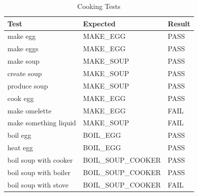 \documentclass[11pt]{article}
\begin{document}
\begin{appendices}
\begin{table}[H]
\scriptsize
\centering
\caption{Cooking Tests}
\label{table:cooking-scores}
\begin{tabular}{lll}
\multicolumn{1}{l|}{Test}                           & \multicolumn{1}{l|}{Expected}           & Result                       \\ \hline
\multicolumn{1}{l|}{make egg}                       & \multicolumn{1}{l|}{MAKE\_EGG}          & \cellcolor[HTML]{67FD9A}PASS \\ \hline
\multicolumn{1}{l|}{make eggs}                      & \multicolumn{1}{l|}{MAKE\_EGG}          & \cellcolor[HTML]{67FD9A}PASS \\ \hline
\multicolumn{1}{l|}{make soup}                      & \multicolumn{1}{l|}{MAKE\_SOUP}         & \cellcolor[HTML]{67FD9A}PASS \\ \hline
\multicolumn{1}{l|}{create soup}                    & \multicolumn{1}{l|}{MAKE\_SOUP}         & \cellcolor[HTML]{67FD9A}PASS \\ \hline
\multicolumn{1}{l|}{produce soup}                   & \multicolumn{1}{l|}{MAKE\_SOUP}         & \cellcolor[HTML]{67FD9A}PASS \\ \hline
\multicolumn{1}{l|}{cook egg}                       & \multicolumn{1}{l|}{MAKE\_EGG}          & \cellcolor[HTML]{67FD9A}PASS \\ \hline
\multicolumn{1}{l|}{make omelette}                  & \multicolumn{1}{l|}{MAKE\_EGG}          & \cellcolor[HTML]{FD6864}FAIL \\ \hline
\multicolumn{1}{l|}{make something liquid}          & \multicolumn{1}{l|}{MAKE\_SOUP}         & \cellcolor[HTML]{FD6864}FAIL \\ \hline
\multicolumn{1}{l|}{boil egg}                       & \multicolumn{1}{l|}{BOIL\_EGG}          & \cellcolor[HTML]{67FD9A}PASS \\ \hline
\multicolumn{1}{l|}{heat egg}                       & \multicolumn{1}{l|}{BOIL\_EGG}          & \cellcolor[HTML]{67FD9A}PASS \\ \hline
\multicolumn{1}{l|}{boil soup with cooker}          & \multicolumn{1}{l|}{BOIL\_SOUP\_COOKER} & \cellcolor[HTML]{67FD9A}PASS \\ \hline
\multicolumn{1}{l|}{boil soup with boiler}          & \multicolumn{1}{l|}{BOIL\_SOUP\_COOKER} & \cellcolor[HTML]{67FD9A}PASS \\ \hline
\multicolumn{1}{l|}{boil soup with stove}           & \multicolumn{1}{l|}{BOIL\_SOUP\_COOKER} & \cellcolor[HTML]{FD6864}FAIL \\ \hline

\end{tabular}
\end{table}
\end{appendices}
\end{document}
